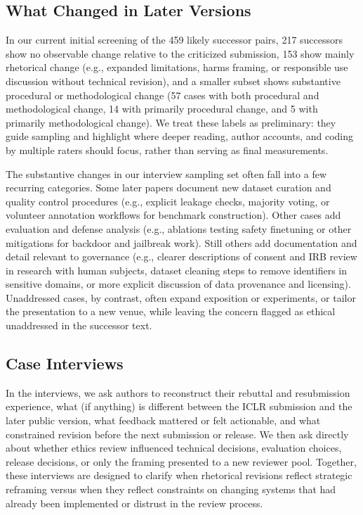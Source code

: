\documentclass[sigconf,nonacm]{acmart} %
\begin{document}
\subsection{What Changed in Later Versions}

In our current initial screening of the 459 likely successor pairs, 217 successors show no observable change relative to the criticized submission, 153 show mainly rhetorical change (e.g., expanded limitations, harms framing, or responsible use discussion without technical revision), and a smaller subset shows substantive procedural or methodological change (57 cases with both procedural and methodological change, 14 with primarily procedural change, and 5 with primarily methodological change). We treat these labels as preliminary: they guide sampling and highlight where deeper reading, author accounts, and coding by multiple raters should focus, rather than serving as final measurements.

The substantive changes in our interview sampling set often fall into a few recurring categories. Some later papers document new dataset curation and quality control procedures (e.g., explicit leakage checks, majority voting, or volunteer annotation workflows for benchmark construction). Other cases add evaluation and defense analysis (e.g., ablations testing safety finetuning or other mitigations for backdoor and jailbreak work). Still others add documentation and detail relevant to governance (e.g., clearer descriptions of consent and IRB review in research with human subjects, dataset cleaning steps to remove identifiers in sensitive domains, or more explicit discussion of data provenance and licensing). Unaddressed cases, by contrast, often expand exposition or experiments, or tailor the presentation to a new venue, while leaving the concern flagged as ethical unaddressed in the successor text.

\subsection{Case Interviews}

In the interviews, we ask authors to reconstruct their rebuttal and resubmission experience, what (if anything) is different between the ICLR submission and the later public version, what feedback mattered or felt actionable, and what constrained revision before the next submission or release. We then ask directly about whether ethics review influenced technical decisions, evaluation choices, release decisions, or only the framing presented to a new reviewer pool. Together, these interviews are designed to clarify when rhetorical revisions reflect strategic reframing versus when they reflect constraints on changing systems that had already been implemented or distrust in the review process.
\end{document}
